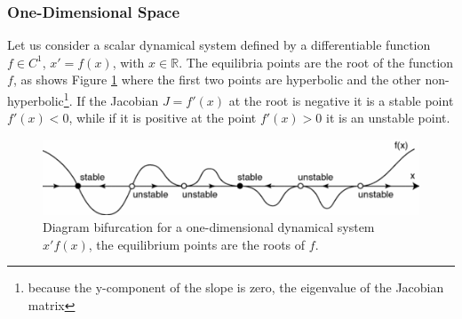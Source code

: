 
\subsubsection{One-Dimensional Space}

Let us consider a scalar dynamical system defined by a differentiable function $f\in C^1$, $x' = f(x)$, with $x\in\mathbb{R}$. The equilibria points are the root of the function $f$, as shows Figure \ref{fig:1d} where the first two points are hyperbolic and the other non-hyperbolic\footnote{because the y-component of the slope is zero, the eigenvalue of the Jacobian matrix}. If the Jacobian $J=f'(x)$ at the root is negative it is a stable point $f'(x)<0$, while if it is positive at the point $f'(x)>0$ it is an unstable point.

\begin{figure}[H]
    \centering
    \includegraphics[scale=0.85]{Images/1d.png}
    \caption{Diagram bifurcation for a one-dimensional dynamical system $x'f(x)$, the equilibrium points are the roots of $f$.}
    \label{fig:1d}
\end{figure}


